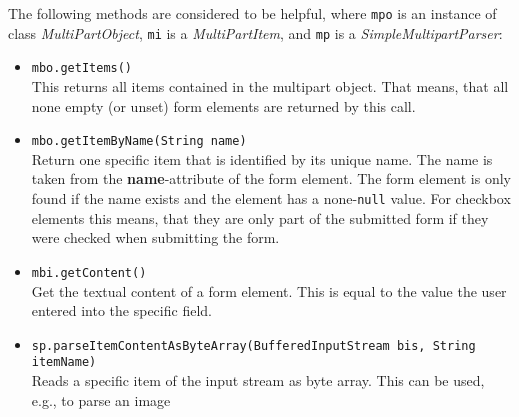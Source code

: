 		The following methods are considered to be helpful, where
\verb!mpo! is an instance of class \textit{MultiPartObject}, \verb!mi! is a
\textit{MultiPartItem}, and \verb!mp! is a \textit{SimpleMultipartParser}:
		\begin{itemize}
			\item \verb!mbo.getItems()!\\
			This returns all items contained in the multipart
object. That means, that all none empty (or unset) form elements are returned by
this call.
			\item \verb!mbo.getItemByName(String name)!\\
			Return one specific item that is identified by its
unique name. The name is taken from the \textbf{name}-attribute of the form
element. The form element is only found if the name exists and the element has a
none-\verb!null! value. For checkbox elements this means, that they are only
part of the submitted form if they were checked when submitting the form.
			\item \verb!mbi.getContent()!\\
			Get the textual content of a form element. This is equal
to the value the user entered into the specific field.
		
			\item
\verb!sp.parseItemContentAsByteArray(BufferedInputStream bis, String itemName)!\\
			Reads a specific item of the input stream as byte array.
This can be used, e.g., to parse an image
			
		\end{itemize}